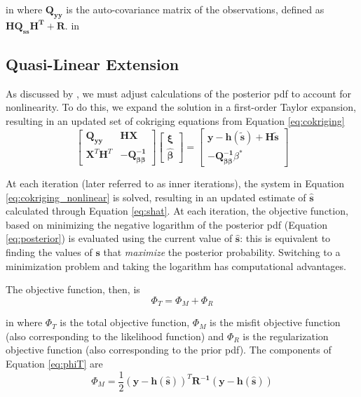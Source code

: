 \documentclass[11pt,oneside,onecolumn]{usgsreport}
\begin{document}
\begin{appendix}
\begin{bibunit}
 in
where $\mathbf{Q_{yy}}$ is the auto-covariance matrix of the observations,
defined as $\mathbf{HQ_{ss}H^{\mathbf{T}}+R}$.
 in

\subsection{Quasi-Linear Extension}

As discussed by \citet{Kitanidis1995}, we must adjust calculations
of the posterior pdf to account for nonlinearity. To do this, we expand
the solution in a first-order Taylor expansion, resulting in an updated
set of cokriging equations from Equation \ref{eq:cokriging}
\begin{equation}
\left[\begin{array}{cc}
\mathbf{Q_{yy}} & \mathbf{HX}\\
\mathbf{X}^{T}\mathbf{H}^{T} & \mathbf{-}\mathbf{Q_{\beta\beta}^{-1}}
\end{array}\right]\left[\begin{array}{c}
\mathbf{\xi}\\
\mathbf{\hat{\beta}}
\end{array}\right]=\left[\begin{array}{c}
\mathbf{y}-\mathbf{h}\left(\mathbf{\tilde{s}}\right)+\mathbf{H}\tilde{\mathbf{s}}\\
\mathbf{-}\mathbf{Q_{\beta\beta}^{-1}}\beta^{*}
\end{array}\right]\label{eq:cokriging_nonlinear}
\end{equation}


At each iteration (later referred to as inner iterations), the system
in Equation \ref{eq:cokriging_nonlinear} is solved, resulting in
an updated estimate of $\hat{\mathbf{s}}$ calculated through Equation
\ref{eq:shat}. At each iteration, the objective function, based on
minimizing the negative logarithm of the posterior pdf (Equation \ref{eq:posterior})
is evaluated using the current value of $\mathbf{\hat{s}}$: this
is equivalent to finding the values of $\mathbf{s}$ that \emph{maximize
}the posterior probability. Switching to a minimization problem and
taking the logarithm has computational advantages. 

The objective function, then, is 
\begin{equation}
\Phi_{T}=\Phi_{M}+\Phi_{R}\label{eq:phiT}
\end{equation}

 in
where $\Phi_{T}$ is the total objective function, $\Phi_{M}$
is the misfit objective function (also corresponding to the likelihood
function) and $\Phi_{R}$ is the regularization objective
function (also corresponding to the prior pdf). The components of
Equation \ref{eq:phiT} are
\[
\Phi_{M}=\frac{1}{2}\left(\mathbf{y-h}(\mathbf{\hat{s}})\right)^{T}\mathbf{R^{-1}\left(\mathbf{y-h}(\mathbf{\hat{s}})\right)}
\]



\end{bibunit}
\end{appendix}
\end{document}
